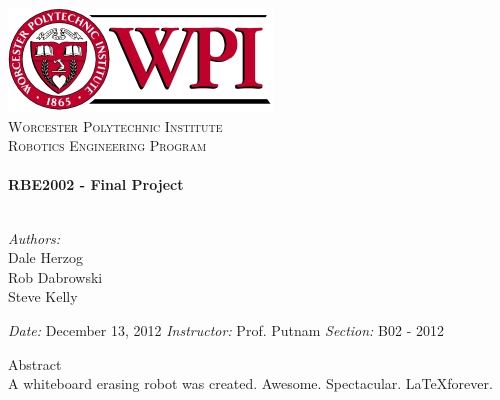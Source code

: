 \begin{titlepage}

\begin{center}


\includegraphics{wpi_logo.jpg}\\[1cm]

\textsc{\LARGE Worcester Polytechnic Institute}\\[1cm]

\textsc{\Large Robotics Engineering Program}\\[1cm]


\HRule \\[1cm]
{ \huge \bfseries RBE2002 - Final Project}\\[1cm]

\HRule \\[1cm]

\begin{minipage}{0.4\textwidth}
\begin{flushleft} \large
\emph{Authors:}\\
Dale Herzog \\
Rob Dabrowski \\
Steve Kelly \\
\end{flushleft}
\end{minipage}
\begin{minipage}{0.4\textwidth}
\begin{flushright} \large
\emph{Date:} 
December 13, 2012 
\emph{Instructor:} 
Prof. Putnam 
\emph{Section:} 
B02 - 2012
\end{flushright}
\end{minipage}

\vfill
\end{center}

{\Large Abstract} \\
    A whiteboard erasing robot was created. Awesome. Spectacular. \LaTeX forever. 

\end{titlepage}
